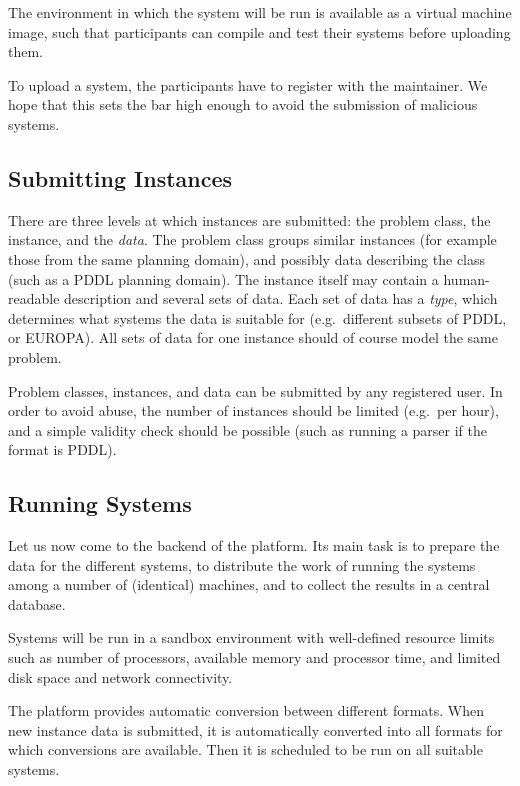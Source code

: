 The environment in which the system will be run is available as a virtual machine image, such that participants can compile and test their systems before uploading them.

To upload a system, the participants have to register with the maintainer. We hope that this sets the bar high enough to avoid the submission of malicious systems.

\subsection{Submitting Instances}

There are three levels at which instances are submitted: the problem class, the instance, and the \emph{data}. The problem class groups similar instances (for example those from the same planning domain), and possibly data describing the class (such as a PDDL planning domain). The instance itself may contain a human-readable description and several sets of data. Each set of data has a \emph{type}, which determines what systems the data is suitable for (e.g.\ different subsets of PDDL, or EUROPA). All sets of data for one instance should of course model the same problem.

Problem classes, instances, and data can be submitted by any registered user. In order to avoid abuse, the number of instances should be limited (e.g.\ per hour), and a simple validity check should be possible (such as running a parser if the format is PDDL).

\subsection{Running Systems}

Let us now come to the backend of the platform. Its main task is to prepare the data for the different systems, to distribute the work of running the systems among a number of (identical) machines, and to collect the results in a central database.

Systems will be run in a sandbox environment with well-defined resource limits such as number of processors, available memory and processor time, and limited disk space and network connectivity.

The platform provides automatic conversion between different formats. When new instance data is submitted, it is automatically converted into all formats for which conversions are available. Then it is scheduled to be run on all suitable systems.

